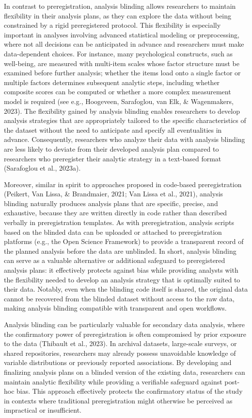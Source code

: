 \documentclass[
  english,
  man,floatsintext]{apa6}
\begin{document}
In contrast to preregistration, analysis blinding allows researchers to maintain flexibility in their analysis plans, as they can explore the data without being constrained by a rigid preregistered protocol. This flexibility is especially important in analyses involving advanced statistical modeling or preprocessing, where not all decisions can be anticipated in advance and researchers must make data-dependent choices. For instance, many psychological constructs, such as well-being, are measured with multi-item scales whose factor structure must be examined before further analysis; whether the items load onto a single factor or multiple factors determines subsequent analytic steps, including whether composite scores can be computed or whether a more complex measurement model is required (see e.g., Hoogeveen, Sarafoglou, van Elk, \& Wagenmakers, 2023). The flexibility gained by analysis blinding enables researchers to develop analysis strategies that are appropriately tailored to the specific characteristics of the dataset without the need to anticipate and specify all eventualities in advance. Consequently, researchers who analyze their data with analysis blinding are less likely to deviate from their developed analysis plan compared to researchers who preregister their analytic strategy in a text-based format (Sarafoglou et al., 2023a).

Moreover, similar in spirit to approaches proposed in code-based preregistration (Peikert, Van Lissa, \& Brandmaier, 2021; Van Lissa et al., 2021), analysis blinding naturally produces analysis plans that are specific, precise, and exhaustive, because they are written directly in code rather than described verbally in preregistration templates. As with preregistration, analysis scripts based on the blinded data can be uploaded or attached to preregistration platforms (e.g., the Open Science Framework) to provide a transparent record of the planned analysis before the data are unblinded. In short, analysis blinding can serve as a valuable alternative or additional safeguard to preregistered analysis plans: it effectively protects against bias while providing analysts with the flexibility needed to develop an analysis strategy that is optimally suited to their data. Notably, even when the blinding code itself is shared, the original data cannot be recovered from the blinded dataset without access to the raw data, making analysis blinding compatible with transparent and open workflows.

Analysis blinding can be particularly valuable for secondary data analysis, where the confirmatory power of preregistration is often compromised by prior exposure to the data (Thibault et al., 2023). In archival datasets, large-scale surveys, or shared repositories, researchers may already possess unavoidable knowledge of variable distributions or previously reported associations. By developing and finalizing analysis plans on a blinded version of the existing data, researchers can maintain analytic flexibility while providing a verifiable safeguard against post-hoc bias. This approach effectively protects the confirmatory status of the study in contexts where traditional preregistration might otherwise be perceived as impractical or insufficient.
\end{document}
